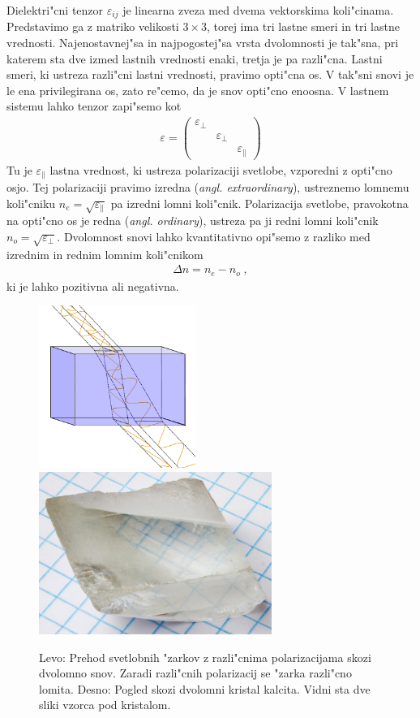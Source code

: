 \documentclass[12pt,twoside,openright,final]{report}
\newcommand{\angl}[1]{(\textit{angl. #1})}
\begin{document}
Dielektri"cni tenzor $\varepsilon_{ij}$ je linearna zveza med dvema vektorskima koli"cinama. 
Predstavimo ga z matriko velikosti $3\times 3$, torej ima tri lastne smeri in tri lastne vrednosti.
Najenostavnej"sa in najpogostej"sa vrsta dvolomnosti je tak"sna, pri katerem sta dve izmed lastnih vrednosti enaki, tretja je pa razli"cna. 
Lastni smeri, ki ustreza razli"cni lastni vrednosti, pravimo opti"cna os. 
V tak"sni snovi je le ena privilegirana os, zato re"cemo, da je snov opti"cno enoosna. 
V lastnem sistemu lahko tenzor zapi"semo kot
\begin{align}
  \varepsilon = \begin{pmatrix}\varepsilon_\perp & & \\ & \varepsilon_\perp & \\ & & \varepsilon_\parallel \end{pmatrix}
\end{align}
Tu je $\varepsilon_\parallel$ lastna vrednost, ki ustreza polarizaciji svetlobe, vzporedni z opti"cno osjo. 
Tej polarizaciji pravimo izredna \angl{extraordinary}, ustreznemo lomnemu koli"cniku $n_e = \sqrt{\varepsilon_\parallel}$ pa izredni lomni koli"cnik. 
Polarizacija svetlobe, pravokotna na opti"cno os je redna \angl{ordinary}, ustreza pa ji redni lomni koli"cnik $n_o = \sqrt{\varepsilon_\perp}$. 
Dvolomnost snovi lahko kvantitativno opi"semo z razliko med izrednim in rednim lomnim koli"cnikom
\begin{align}
  \Delta n = n_e - n_o\;,
\end{align}
ki je lahko pozitivna ali negativna. 

\begin{figure}[h]
  \centering
  \includegraphics[height=150pt]{Rays_passing_through_birefringent_material}
  \includegraphics[height=150pt]{Crystal_on_graph_paper}
  \caption{Levo: Prehod svetlobnih "zarkov z razli"cnima polarizacijama skozi dvolomno snov. 
Zaradi razli"cnih polarizacij se "zarka razli"cno lomita. Desno: Pogled skozi dvolomni kristal kalcita. Vidni sta dve sliki vzorca pod kristalom. \cite{wiki:birefringence}}
  \label{fig:dvolomnost}
\end{figure}
\end{document}

